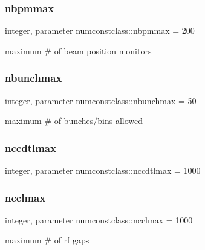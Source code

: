 \subsubsection{\texorpdfstring{nbpmmax}{nbpmmax}}
{\footnotesize\ttfamily integer, parameter numconstclass\+::nbpmmax = 200}



maximum \# of beam position monitors 

\mbox{\label{namespacenumconstclass_ac218e74533123f49148ceb12b1d3b16e}} 
\subsubsection{\texorpdfstring{nbunchmax}{nbunchmax}}
{\footnotesize\ttfamily integer, parameter numconstclass\+::nbunchmax = 50}



maximum \# of bunches/bins allowed 

\mbox{\label{namespacenumconstclass_a27ee6b57f509d99358609230f3ea289a}} 
\subsubsection{\texorpdfstring{nccdtlmax}{nccdtlmax}}
{\footnotesize\ttfamily integer, parameter numconstclass\+::nccdtlmax = 1000}

\mbox{\label{namespacenumconstclass_ad4189a0ff5d1f4848364ea3012cddfd0}} 
\subsubsection{\texorpdfstring{ncclmax}{ncclmax}}
{\footnotesize\ttfamily integer, parameter numconstclass\+::ncclmax = 1000}



maximum \# of rf gaps 

\mbox{\label{namespacenumconstclass_a94e49bcdcfdd3ed05de0d41af396f4d1}} 
